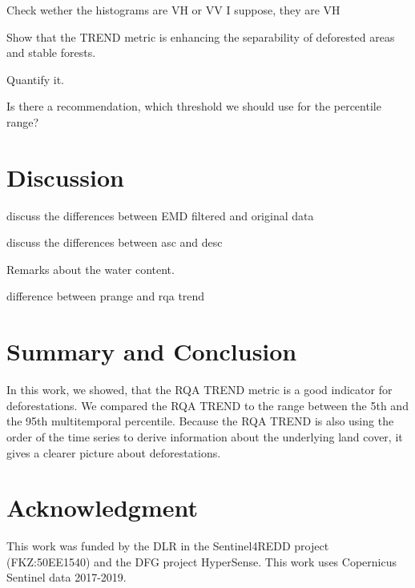 \documentclass{article}
\begin{document}
Check wether the histograms are VH or VV I suppose, they are VH

Show that the TREND metric is enhancing the separability of deforested areas and stable forests.

Quantify it.


Is there a recommendation, which threshold we should use for the percentile range?

\section{Discussion}

discuss the differences between EMD filtered and original data

discuss the differences between asc and desc

Remarks about the water content.


difference between prange and rqa trend



\section{Summary and Conclusion}
In this work, we showed, that the RQA TREND metric is a good indicator for deforestations.
We compared the RQA TREND to the range between the 5th and the 95th multitemporal percentile.
Because the RQA TREND is also using the order of the time series to derive information about the underlying land cover,
it gives a clearer picture about deforestations.



\section*{Acknowledgment}
This work was funded by the DLR in the Sentinel4REDD project (FKZ:50EE1540) and
the DFG project HyperSense.
This work uses Copernicus Sentinel data 2017-2019.




\end{document}
